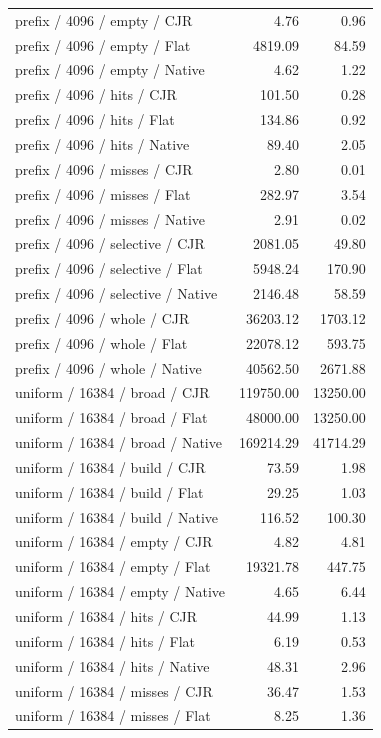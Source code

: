 \begin{longtable}{p{}rr}
prefix / 4096 / empty / CJR & 4.76 & 0.96 \\
prefix / 4096 / empty / Flat & 4819.09 & 84.59 \\
prefix / 4096 / empty / Native & 4.62 & 1.22 \\
prefix / 4096 / hits / CJR & 101.50 & 0.28 \\
prefix / 4096 / hits / Flat & 134.86 & 0.92 \\
prefix / 4096 / hits / Native & 89.40 & 2.05 \\
prefix / 4096 / misses / CJR & 2.80 & 0.01 \\
prefix / 4096 / misses / Flat & 282.97 & 3.54 \\
prefix / 4096 / misses / Native & 2.91 & 0.02 \\
prefix / 4096 / selective / CJR & 2081.05 & 49.80 \\
prefix / 4096 / selective / Flat & 5948.24 & 170.90 \\
prefix / 4096 / selective / Native & 2146.48 & 58.59 \\
prefix / 4096 / whole / CJR & 36203.12 & 1703.12 \\
prefix / 4096 / whole / Flat & 22078.12 & 593.75 \\
prefix / 4096 / whole / Native & 40562.50 & 2671.88 \\
uniform / 16384 / broad / CJR & 119750.00 & 13250.00 \\
uniform / 16384 / broad / Flat & 48000.00 & 13250.00 \\
uniform / 16384 / broad / Native & 169214.29 & 41714.29 \\
uniform / 16384 / build / CJR & 73.59 & 1.98 \\
uniform / 16384 / build / Flat & 29.25 & 1.03 \\
uniform / 16384 / build / Native & 116.52 & 100.30 \\
uniform / 16384 / empty / CJR & 4.82 & 4.81 \\
uniform / 16384 / empty / Flat & 19321.78 & 447.75 \\
uniform / 16384 / empty / Native & 4.65 & 6.44 \\
uniform / 16384 / hits / CJR & 44.99 & 1.13 \\
uniform / 16384 / hits / Flat & 6.19 & 0.53 \\
uniform / 16384 / hits / Native & 48.31 & 2.96 \\
uniform / 16384 / misses / CJR & 36.47 & 1.53 \\
uniform / 16384 / misses / Flat & 8.25 & 1.36 \\

\end{longtable}
